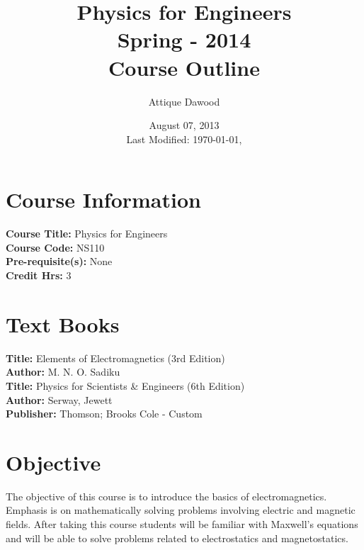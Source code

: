 \documentclass[12pt,a4paper]{article}
\title{\vspace{-3.5cm}Physics for Engineers\\Spring - 2014\\Course Outline}
\author{Attique Dawood}
\date{August 07, 2013\\[0.2cm] Last Modified: \today, \currenttime}
\begin{document}
\maketitle
\section{Course Information}
\noindent\textbf{Course Title:} Physics for Engineers\\
\textbf{Course Code:} NS110\\
\textbf{Pre-requisite(s):} None\\
\textbf{Credit Hrs:} 3\\
\section{Text Books}
\textbf{Title:} Elements of Electromagnetics (3rd Edition)\\
\textbf{Author:} M. N. O. Sadiku\\[0.5cm]
\textbf{Title:} Physics for Scientists \& Engineers  (6th Edition)\\
\textbf{Author:} Serway, Jewett\\
\textbf{Publisher:} Thomson; Brooks Cole - Custom\\
\section{Objective}
The objective of this course is to introduce the basics of electromagnetics. Emphasis is on mathematically solving problems involving electric and magnetic fields. After taking this course students will be familiar with Maxwell’s equations and will be able to solve problems related to electrostatics and magnetostatics.
\end{document}
